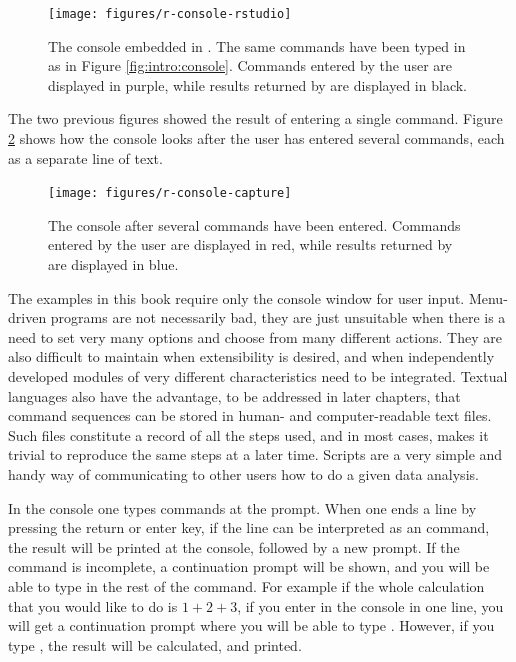 \documentclass[krantz2]{krantz}\usepackage{knitr}
\begin{document}
\begin{figure}
  \centering
  \texttt{[image: figures/r-console-rstudio]}
  \caption[The R console]{The \Rpgrm console embedded in \RStudio. The same commands have been typed in as in Figure \ref{fig:intro:console}. Commands entered by the user are displayed in purple, while results returned by \Rpgrm are displayed in black.}\label{fig:intro:console:rstudio}
\end{figure}

The two previous figures showed the result of entering a single command. Figure \ref{fig:intro:console:capture} shows how the console looks after the user has entered several commands, each as a separate line of text.

\begin{figure}
  \centering
  \texttt{[image: figures/r-console-capture]}
  \caption[The R console]{The \Rpgrm console after several commands have been entered. Commands entered by the user are displayed in red, while results returned by \Rpgrm are displayed in blue.}\label{fig:intro:console:capture}
\end{figure}

The examples in this book require only the console window for user input. Menu-driven programs are not necessarily bad, they are just unsuitable when there is a need to set very many options and choose from many different actions. They are also difficult to maintain when extensibility is desired, and when independently developed modules of very different characteristics need to be integrated. Textual languages also have the advantage, to be addressed in later chapters, that command sequences can be stored in human- and computer-readable text files. Such files constitute a record of all the steps used, and in most cases, makes it trivial to reproduce the same steps at a later time. Scripts are a very simple and handy way of communicating to other users how to do a given data analysis.

\begin{explainbox}
In the console one types commands at the \code{>} prompt. When one ends a line by pressing the return or enter key, if the line can be interpreted as an \Rlang command, the result will be printed at the console, followed by a new \code{>} prompt.
If the command is incomplete, a \code{+} continuation prompt will be shown, and you will be able to type in the rest of the command. For example if the whole calculation that you would like to do is $1 + 2 + 3$, if you enter in the console  in one line, you will get a continuation prompt where you will be able to type . However, if you type , the result will be calculated, and printed.
\end{explainbox}
\end{document}
